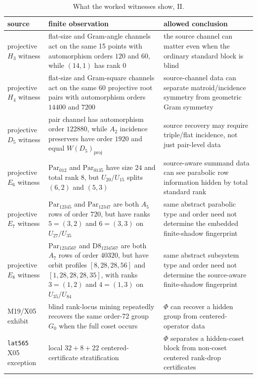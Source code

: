 \begin{table}[!htbp]
\centering
\scriptsize
\setlength{\tabcolsep}{3pt}
\renewcommand{\arraystretch}{0.86}
\caption{What the worked witnesses show, II.}
\begin{tabular}{@{}L{0.24\textwidth}L{0.31\textwidth}L{0.35\textwidth}@{}}
\toprule
source & finite observation & allowed conclusion \\
\midrule
projective \(H_3\) witness & flat-size and Gram-angle channels act on the same 15 points with automorphism orders \(120\) and \(60\), while \((14,1)\) has rank \(0\) & the source channel can matter even when the ordinary standard block is blind \\
projective \(H_4\) witness & flat-size and Gram-square channels act on the same 60 projective root pairs with automorphism orders \(14400\) and \(7200\) & source-channel data can separate matroid/incidence symmetry from geometric Gram symmetry \\
projective \(D_5\) witness & pair channel has automorphism order \(122880\), while \(A_2\) incidence preservers have order \(1920\) and equal \(W(D_5)_{\mathrm{proj}}\) & source recovery may require triple/flat incidence, not just pair-level data \\
projective \(E_6\) witness & \(\mathrm{Par}_{012}\) and \(\mathrm{Par}_{0135}\) have size \(24\) and total rank \(8\), but \(U_{20}/U_{15}\) splits \((6,2)\) and \((5,3)\) & source-aware summand data can see parabolic row information hidden by total standard rank \\
projective \(E_7\) witness & \(\mathrm{Par}_{12345}\) and \(\mathrm{Par}_{12347}\) are both \(A_5\) rows of order \(720\), but have ranks \(5=(3,2)\) and \(6=(3,3)\) on \(U_{27}/U_{35}\) & same abstract parabolic type and order need not determine the embedded finite-shadow fingerprint \\
projective \(E_8\) witness & \(\mathrm{Par}_{1234567}\) and \(\mathrm{D8}_{1234567}\) are both \(A_7\) rows of order \(40320\), but have orbit profiles \([8,28,28,56]\) and \([1,28,28,28,35]\), with ranks \(3=(1,2)\) and \(4=(1,3)\) on \(U_{35}/U_{84}\) & same abstract subsystem type and order need not determine the source-aware finite-shadow fingerprint \\
M19/X05 exhibit & blind rank-locus mining repeatedly recovers the same order-72 group \(G_0\) when the full coset occurs & \(\Phi\) can recover a hidden group from centered-operator data \\
\texttt{lat565} X05 exception & local \(32+8+22\) centered-certificate stratification & \(\Phi\) separates a hidden-coset block from non-coset centered rank-drop certificates \\
\bottomrule
\end{tabular}
\end{table}

